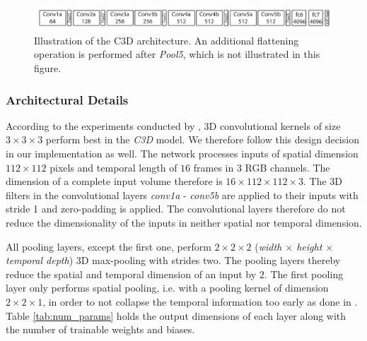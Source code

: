 \begin{figure}[H]
    \centering
    \includegraphics[width=\textwidth]{img_related/c3d_architecture}
    \caption{Illustration of the C3D architecture. An additional flattening operation is performed after \textit{Pool5}, which is not illustrated in this figure. \cite{tran_learning_2015}}
    \label{fig:c3d_architecture}
\end{figure}

\subsubsection{Architectural Details}

According to the experiments conducted by \textcite{tran_learning_2015}, 3D convolutional kernels of size $3 \times 3 \times 3$ perform best in the \textit{C3D} model.
We therefore follow this design decision in our implementation as well.
The network processes inputs of spatial dimension $112 \times 112$ pixels and temporal length of $16$ frames in $3$ RGB channels.
The dimension of a complete input volume therefore is $16 \times 112 \times 112 \times 3$.
The 3D filters in the convolutional layers \textit{conv1a} - \textit{conv5b} are applied to their inputs with stride 1 and zero-padding is applied.
The convolutional layers therefore do not reduce the dimensionality of the inputs in neither spatial nor temporal dimension.

All pooling layers, except the first one, perform $2 \times 2 \times 2$ (\textit{width $\times$ height $\times$ temporal depth}) 3D max-pooling with strides two.
The pooling layers thereby reduce the spatial and temporal dimension of an input by $2$.
The first pooling layer only performs spatial pooling, i.e. with a pooling kernel of dimension $2 \times 2 \times 1$, in order to not collapse the temporal information too early as done in \cite{tran_learning_2015}.
Table \ref{tab:num_params} holds the output dimensions of each layer along with the number of trainable weights and biases.

